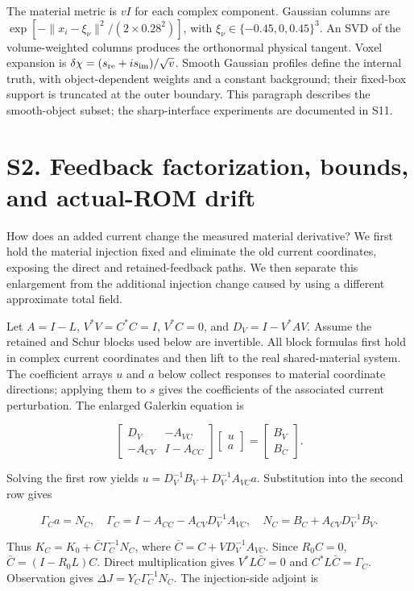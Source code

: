 \documentclass[11pt]{article}
\begin{document}
The material metric is \(vI\) for each complex component. Gaussian columns are \(\exp[-\|x_i-\xi_\nu\|^2/(2\times0.28^2)]\), with \(\xi_\nu\in\{-0.45,0,0.45\}^3\). An SVD of the volume-weighted columns produces the orthonormal physical tangent. Voxel expansion is \(\delta\chi=(s_{\rm re}+is_{\rm im})/\sqrt v\). Smooth Gaussian profiles define the internal truth, with object-dependent weights and a constant background; their fixed-box support is truncated at the outer boundary. This paragraph describes the smooth-object subset; the sharp-interface experiments are documented in S11.

\section*{S2. Feedback factorization, bounds, and actual-ROM drift}

How does an added current change the measured material derivative? We first hold the material injection fixed and eliminate the old current coordinates, exposing the direct and retained-feedback paths. We then separate this enlargement from the additional injection change caused by using a different approximate total field.

Let \(A=I-L\), \(V^*V=C^*C=I\), \(V^*C=0\), and \(D_V=I-V^*AV\). Assume the retained and Schur blocks used below are invertible. All block formulas first hold in complex current coordinates and then lift to the real shared-material system. The coefficient arrays $u$ and $a$ below collect responses to material coordinate directions; applying them to $s$ gives the coefficients of the associated current perturbation. The enlarged Galerkin equation is

\[
\begin{bmatrix}D_V&-A_{VC}\\-A_{CV}&I-A_{CC}\end{bmatrix}
\begin{bmatrix}u\\a\end{bmatrix}
=\begin{bmatrix}B_V\\B_C\end{bmatrix}. \tag{S4}
\]

Solving the first row yields \(u=D_V^{-1}B_V+D_V^{-1}A_{VC}a\). Substitution into the second row gives

\[
\Gamma_Ca=N_C,\quad
\Gamma_C=I-A_{CC}-A_{CV}D_V^{-1}A_{VC},\quad
N_C=B_C+A_{CV}D_V^{-1}B_V. \tag{S5}
\]

Thus \(K_C=K_0+\bar C\Gamma_C^{-1}N_C\), where \(\bar C=C+VD_V^{-1}A_{VC}\). Since \(R_0C=0\), \(\bar C=(I-R_0L)C\). Direct multiplication gives \(V^*L\bar C=0\) and \(C^*L\bar C=\Gamma_C\). Observation gives \(\Delta J=Y_C\Gamma_C^{-1}N_C\). The injection-side adjoint is
\end{document}
